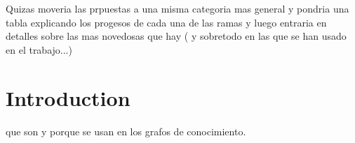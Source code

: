 Quizas moveria las prpuestas a una misma categoria mas general y pondria una tabla explicando los progesos de cada una de las ramas y luego entraria en detalles sobre las mas novedosas que hay ( y sobretodo en las que se han usado en el trabajo...)

\section{Introduction}\label{sec:emb-intro}
que son y porque se usan en los grafos de conocimiento.





